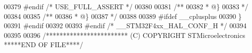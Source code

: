 \begin{DoxyCode}
00379 \textcolor{preprocessor}{#}\textcolor{preprocessor}{endif} \textcolor{comment}{/* USE\_FULL\_ASSERT */}
00380 
00381 \textcolor{comment}{/**}
00382 \textcolor{comment}{  * @\}}
00383 \textcolor{comment}{  */}
00384 
00385 \textcolor{comment}{/**}
00386 \textcolor{comment}{  * @\}}
00387 \textcolor{comment}{  */}
00388 
00389 \textcolor{preprocessor}{#}\textcolor{preprocessor}{ifdef} \_\_cplusplus
00390 \}
00391 \textcolor{preprocessor}{#}\textcolor{preprocessor}{endif}
00392 
00393 \textcolor{preprocessor}{#}\textcolor{preprocessor}{endif} \textcolor{comment}{/* \_\_STM32F4xx\_HAL\_CONF\_H */}
00394 
00395 
00396 \textcolor{comment}{/************************ (C) COPYRIGHT STMicroelectronics *****END OF FILE****/}
\end{DoxyCode}
